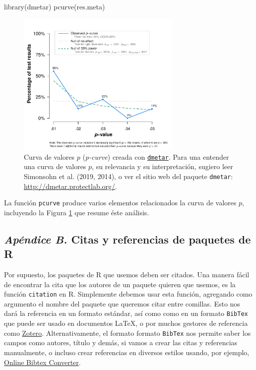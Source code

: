 \documentclass[
  bookmarksnumbered]{article}
\newenvironment{Shaded}{\begin{snugshade}}{\end{snugshade}}
\newcommand{\FunctionTok}[1]{\textcolor[rgb]{0.39,0.29,0.61}{#1}}
\newcommand{\NormalTok}[1]{\textcolor[rgb]{0.12,0.11,0.11}{#1}}
\begin{document}
\begin{Shaded}
\begin{Highlighting}[]
\FunctionTok{library}\NormalTok{(dmetar)}
\FunctionTok{pcurve}\NormalTok{(res.meta)}
\end{Highlighting}
\end{Shaded}

\begin{figure}

{\centering \includegraphics[width=300px]{images/pcurve} 

}

\caption{Curva de valores $p$ (\textit{p-curve}) creada con \href{http://dmetar.protectlab.org/}{\texttt{dmetar}}. Para una entender una curva de valores $p$, su relevancia y su interpretación, sugiero leer Simonsohn et al. (2019, 2014), o ver el sitio web del paquete \texttt{dmetar}: \href{http://dmetar.protectlab.org/}{http://dmetar.protectlab.org/}.}\label{fig:pcurve-plot}
\end{figure}

La función \texttt{pcurve} produce varios elementos relacionados la curva de valores \(p\), incluyendo la Figura \ref{fig:pcurve-plot} que resume éste análisis.

\hypertarget{paquetes-cit}{%
\subsection*{\texorpdfstring{\emph{Apéndice B.} Citas y referencias de paquetes de R}{Apéndice B. Citas y referencias de paquetes de R}}\label{paquetes-cit}}

Por supuesto, los paquetes de R que usemos deben ser citados. Una manera fácil de encontrar la cita que los autores de un paquete quieren que usemos, es la función \texttt{citation} en R. Simplemente debemos usar esta función, agregando como argumento el nombre del paquete que queremos citar entre comillas. Esto nos dará la referencia en un formato estándar, así como como en un formato \texttt{BibTex} que puede ser usado en documentos \LaTeX, o por muchos gestores de referencia como \href{https://www.zotero.org/}{Zotero}. Alternativamente, el formato formato \texttt{BibTex} nos permite saber los campos como autores, título y demás, si vamos a crear las citas y referencias manualmente, o incluso crear referencias en diversos estilos usando, por ejemplo, \href{https://asouqi.github.io/bibtex-converter/}{Online Bibtex Converter}.
\end{document}
